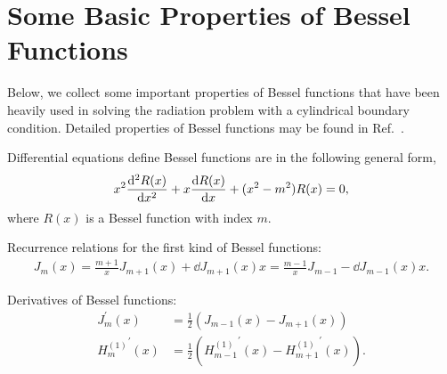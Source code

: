 \chapter{Some Basic Properties of Bessel Functions}\label{chap:Besselfunctions}
Below, we collect some important properties of Bessel functions that have been heavily used in solving the radiation problem with a cylindrical boundary condition. 
Detailed properties of Bessel functions may be found in Ref.~\cite{Watson1995}.

Differential equations define Bessel functions are in the following general form,
\begin{align}
x^2\frac{{\mathrm d}^2 {R(x)}}{{\mathrm d}{x}^2}+x\frac{{\mathrm d} {R(x)}}{{\mathrm d} {x}}+(x^2-m^2)R(x)=0,
\end{align}
where $R(x)$ is a Bessel function with index $m$. 

Recurrence relations for the first kind of Bessel functions:
\begin{align}
J_m(x)=\frac{m+1}{x}J_{m+1}(x)+\dd{J_{m+1}(x)}{x}=\frac{m-1}{x}J_{m-1}-\dd{J_{m-1}(x)}{x}.
\end{align}

Derivatives of Bessel functions:
\begin{align}
J_m^\prime(x)&=\frac{1}{2}(J_{m-1}(x)-J_{m+1}(x))\\
{H^{(1)}_m}^\prime (x) &=\frac{1}{2}({H^{(1)}_{m-1}}^\prime (x)-{H^{(1)}_{m+1}}^\prime(x)).
\end{align}